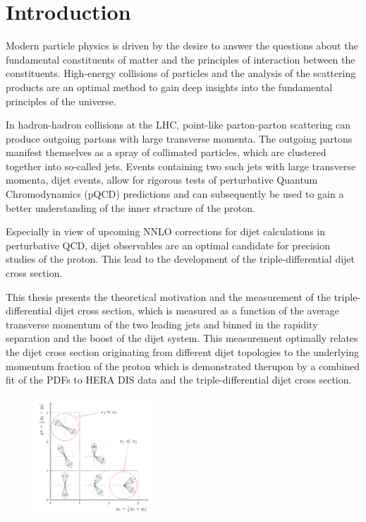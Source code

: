 
\chapter{Introduction}

Modern particle physics is driven by the desire to answer the questions about the
fundamental constituents of matter and the principles of interaction between the
constituents. High-energy collisions of particles and the analysis of the
scattering products are an optimal method to gain deep insights into the
fundamental principles of the universe. 

In hadron-hadron collisions at the LHC, point-like parton-parton scattering can
produce outgoing partons with large transverse momenta. The outgoing partons
manifest themselves as a spray of collimated particles, which are clustered
together into so-called jets. Events containing two such jets with large
transverse momenta, dijet events, allow for rigorous tests of
perturbative Quantum Chromodynamics (pQCD) predictions and can subsequently be
used to gain a better understanding of the inner structure of the proton. 

Especially in view of upcoming NNLO corrections for dijet calculations in
perturbative QCD, dijet observables are an optimal candidate for precision
studies of the proton. This lead to the development of the triple-differential
dijet cross section. 

This thesis presents the theoretical motivation and the measurement of the
triple-differential dijet cross section, which is measured as a function of the
average transverse momentum of the two leading jets and binned in the rapidity
separation and the boost of the dijet system. This measurement optimally relates
the dijet cross section originating from different dijet topologies to the
underlying momentum fraction of the proton which is demonstrated therupon by a
combined fit of the PDFs to HERA DIS data and the triple-differential dijet
cross section.

\begin{figure}[h!tb]
    \centering
    \includegraphics[width=0.4\textwidth]{figures/drawings/ybys_hint.pdf}
\end{figure}


